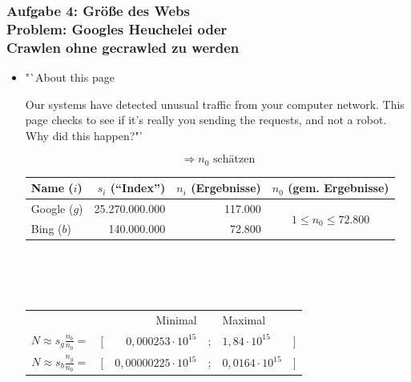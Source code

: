 \documentclass[accentcolor=tud7b,noresetcounter]{tudbeamer}
\begin{document}
  \begin{frame}
      \frametitle{Aufgabe 4: Größe des Webs \\Problem: Googles Heuchelei oder\\ Crawlen ohne gecrawled zu werden}
      \begin{itemize}
       \item 
       \begin{allintypewriter}
       "`About this page

	Our systems have detected unusual traffic from your computer network. This page checks to see if it's really you sending the requests, and not a robot. Why did this happen?"'
       \end{allintypewriter}
	$$\Rightarrow n_0 \text{ schätzen}$$ 
	\begin{tabular}{|l|r|r|c|}
	  \hline
	  \textbf{Name ($i$)} & \textbf{$s_i$ ("`Index"')} & \textbf{$n_i$ (Ergebnisse)} & \textbf{$n_0$ (gem. Ergebnisse)}\\
	  \hline
	  Google ($g$) & 25.270.000.000 & 117.000 & \multirow{ 2}{*}{\large{$1 \leq n_0 \leq 72.800$}}\\
	  Bing ($b$)  & 140.000.000 & 72.800 & \\
	  \hline
  	\end{tabular} \\
  	\hfill \\
  	\hfill \\
  	\begin{tabular}{rrrcll}
  	 & & Minimal & & Maximal & \\
  	 $N\approx s_g \frac{n_b}{n_0} = $ & $[$ & $0,000253 \cdot 10^{15}$ & ; & $1,84 \cdot 10^{15}$ & $]$ \\
  	 $N\approx s_b \frac{n_g}{n_0} = $ & $[$ & $0,00000225 \cdot 10^{15}$ & ; & $0,0164 \cdot 10^{15}$ & $]$ 
  	\end{tabular}
      \end{itemize}
  \end{frame}
  
\end{document}
